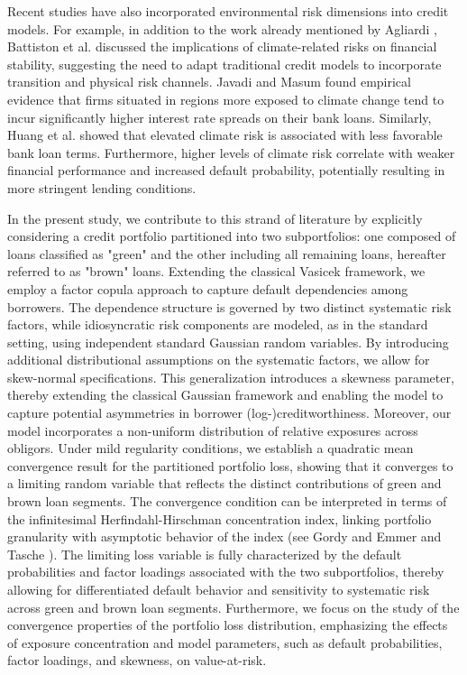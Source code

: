 \documentclass[preprint,12pt]{article}
\begin{document}
Recent studies have also incorporated environmental risk dimensions into credit models. For example, in addition to the work already mentioned by Agliardi \cite{agl21}, Battiston et al. \cite{battiston2017} discussed the implications of climate-related risks on financial stability, suggesting the need to adapt traditional credit models to incorporate transition and physical risk channels. Javadi and Masum \cite{jm21} found empirical evidence that firms situated in regions more exposed to climate change tend to incur significantly higher interest rate spreads on their bank loans. Similarly, Huang et al. \cite{hkww22} showed that elevated climate risk is associated with less favorable bank loan terms. Furthermore, higher levels of climate risk correlate with weaker financial performance and increased default probability, potentially resulting in more stringent lending conditions.


In the present study, we contribute to this strand of literature by explicitly considering a credit portfolio partitioned into two subportfolios: one composed of loans classified as "green" and the other including all remaining loans, hereafter referred to as "brown" loans. Extending the classical Vasicek framework, we employ a factor copula approach to capture default dependencies among borrowers. The dependence structure is governed by two distinct systematic risk factors, while idiosyncratic risk components are modeled, as in the standard setting, using independent standard Gaussian random variables. By introducing additional distributional assumptions on the systematic factors, we allow for skew-normal specifications. This generalization introduces a skewness parameter, thereby extending the classical Gaussian framework and enabling the model to capture potential asymmetries in borrower (log-)creditworthiness.
Moreover, our model incorporates a non-uniform distribution of relative exposures across obligors. Under mild regularity conditions, we establish a quadratic mean convergence result for the partitioned portfolio loss, showing that it converges to a limiting random variable that reflects the distinct contributions of green and brown loan segments. The convergence condition can be interpreted in terms of the infinitesimal Herfindahl-Hirschman concentration index, linking portfolio granularity with asymptotic behavior of the index (see Gordy \cite{gordy} and Emmer and Tasche \cite{EmmTasc}). 
The limiting loss variable is fully characterized by the default probabilities and factor loadings associated with the two subportfolios, thereby allowing for differentiated default behavior and sensitivity to systematic risk across green and brown loan segments. Furthermore, we focus on the study of the convergence properties of the portfolio loss distribution, emphasizing the effects of exposure concentration and model parameters, such as default probabilities, factor loadings, and skewness, on value-at-risk.
\end{document}
